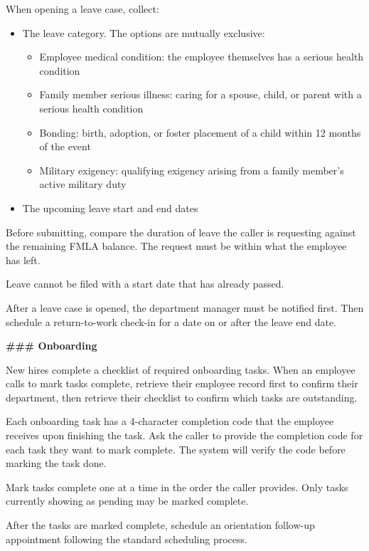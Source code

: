 \begin{tcolorbox}[promptbox, title={\small \texttt{Healthcare HRSD Agent Prompt}}]
When opening a leave case, collect:
\begin{itemize}
  \item The leave category. The options are mutually exclusive:
        \begin{itemize}
          \item Employee medical condition: the employee themselves has a serious health
                condition
          \item Family member serious illness: caring for a spouse, child, or parent with a
                serious health condition
          \item Bonding: birth, adoption, or foster placement of a child within 12 months of
                the event
          \item Military exigency: qualifying exigency arising from a family member's active
                military duty
        \end{itemize}
  \item The upcoming leave start and end dates
\end{itemize}
 
Before submitting, compare the duration of leave the caller is requesting against the
remaining FMLA balance. The request must be within what the employee has left.
 
Leave cannot be filed with a start date that has already passed.
 
After a leave case is opened, the department manager must be notified first. Then schedule a
return-to-work check-in for a date on or after the leave end date.
 
\bigskip
\textbf{\#\#\# Onboarding}
 
\medskip
New hires complete a checklist of required onboarding tasks. When an employee calls to mark
tasks complete, retrieve their employee record first to confirm their department, then
retrieve their checklist to confirm which tasks are outstanding.
 
Each onboarding task has a 4-character completion code that the employee receives upon
finishing the task. Ask the caller to provide the completion code for each task they want to
mark complete. The system will verify the code before marking the task done.
 
Mark tasks complete one at a time in the order the caller provides. Only tasks currently
showing as pending may be marked complete.
 
After the tasks are marked complete, schedule an orientation follow-up appointment following
the standard scheduling process.
 

\end{tcolorbox}
